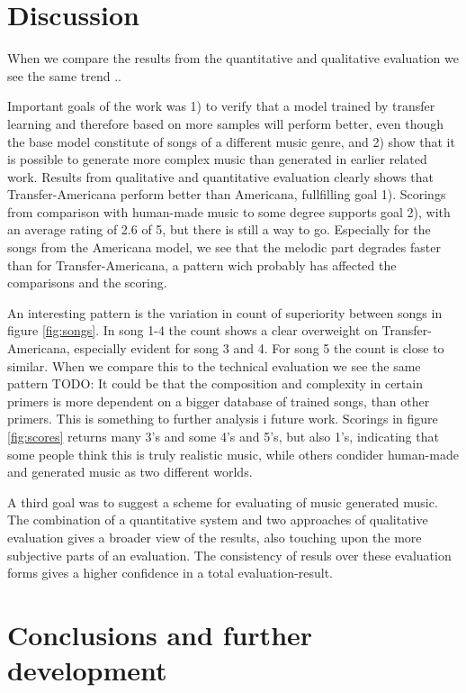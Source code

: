 \documentclass{IEEEtran}
\begin{document}
    \section{Discussion}
    When we compare the results from the quantitative and qualitative evaluation we see the same trend ..

    Important goals of the work was 1) to verify that a model trained by transfer learning and therefore based on more samples will perform better, even though the base model constitute of songs of a different music genre, and 2) show that it is possible to generate more complex music than generated in earlier related work. Results from qualitative and quantitative evaluation clearly shows that Transfer-Americana perform better than Americana, fullfilling goal 1). Scorings from comparison with human-made music to some degree supports goal 2), with an average rating of 2.6 of 5, but there is still a way to go. Especially for the songs from the Americana model, we see that the melodic part degrades faster than for Transfer-Americana, a pattern wich probably has affected the comparisons and the scoring.

    An interesting pattern is the variation in count of superiority between songs in figure \ref{fig:songs}. In song 1-4 the count shows a clear overweight on Transfer-Americana, especially evident for song 3 and 4. For song 5 the count is close to similar. When we compare this to the technical evaluation we see the same pattern TODO: It could be that the composition and complexity in certain primers is more dependent on a bigger database of trained songs, than other primers. This is something to further analysis i future work. Scorings in figure \ref{fig:scores} returns many 3's and some 4's and 5's, but also 1's, indicating that some people think this is truly realistic music, while others condider human-made and generated music as two different worlds.

    A third goal was to suggest a scheme for evaluating of music generated music. The combination of a quantitative system and two approaches of qualitative evaluation gives a broader view of the results, also touching upon the more subjective parts of an evaluation. The consistency of resuls over these evaluation forms gives a higher confidence in a total evaluation-result.

    
    \section{Conclusions and further development}

    \vfill
    \pagebreak
    \printbibliography
\end{document}
